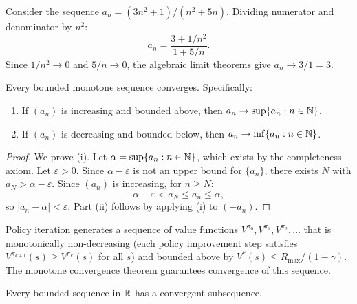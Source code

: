 \documentclass[11pt,a4paper]{article}
\begin{document}
\begin{example}
\label{ex:alg_limit}
Consider the sequence $a_n = (3n^2 + 1)/(n^2 + 5n)$. Dividing numerator
and denominator by $n^2$:
\[
  a_n = \frac{3 + 1/n^2}{1 + 5/n}.
\]
Since $1/n^2 \to 0$ and $5/n \to 0$, the algebraic limit theorems give
$a_n \to 3/1 = 3$.
\end{example}

\begin{keyresult}[title={Monotone Convergence Theorem}]
\begin{theorem}
\label{thm:mct_seq}
Every bounded monotone sequence converges. Specifically:
\begin{enumerate}[nosep,label=(\roman*)]
  \item If $(a_n)$ is increasing and bounded above, then
    $a_n \to \sup\{a_n : n \in \mathbb{N}\}$.
  \item If $(a_n)$ is decreasing and bounded below, then
    $a_n \to \inf\{a_n : n \in \mathbb{N}\}$.
\end{enumerate}
\end{theorem}
\end{keyresult}

\begin{proof}
We prove (i). Let $\alpha = \sup\{a_n : n \in \mathbb{N}\}$, which exists by the
completeness axiom. Let $\varepsilon > 0$. Since $\alpha - \varepsilon$
is not an upper bound for $\{a_n\}$, there exists $N$ with
$a_N > \alpha - \varepsilon$. Since $(a_n)$ is increasing, for
$n \ge N$:
\[
  \alpha - \varepsilon < a_N \le a_n \le \alpha,
\]
so $|a_n - \alpha| < \varepsilon$. Part (ii) follows by applying (i) to
$(-a_n)$.
\end{proof}

\begin{rlconnection}[title={Monotone convergence in policy iteration}]
Policy iteration generates a sequence of value functions $V^{\pi_0},
V^{\pi_1}, V^{\pi_2}, \ldots$ that is monotonically non-decreasing
(each policy improvement step satisfies $V^{\pi_{k+1}}(s) \ge
V^{\pi_k}(s)$ for all $s$) and bounded above by $V^*(s) \le
R_{\max}/(1-\gamma)$. The monotone convergence theorem guarantees
convergence of this sequence.
\end{rlconnection}

\begin{theorem}
\label{thm:bolzano_weierstrass}
Every bounded sequence in $\mathbb{R}$ has a convergent subsequence.
\end{theorem}
\end{document}
